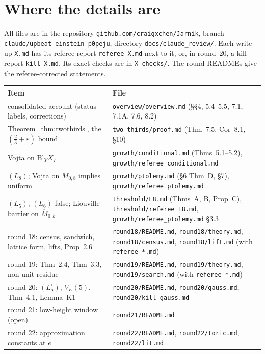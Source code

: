 \documentclass[11pt]{article}
\newcommand{\Mbar}{\overline M_{0,8}}
\newcommand{\rec}[1]{\texttt{#1}}
\begin{document}
\section{Where the details are}\label{sec:pointers}

All files are in the repository \rec{github.com/craigxchen/Jarnik}, branch
\rec{claude/upbeat-einstein-p0peju}, directory \rec{docs/claude\_review/}.
Each write-up \rec{X.md} has its referee report \rec{referee\_X.md} next to it,
or, in round~20, a kill report \rec{kill\_X.md}.  Its exact checks are in
\rec{X\_checks/}.  The round READMEs give the referee-corrected statements.

\begin{center}
\small
\begin{tabular}{@{}p{}p{}@{}}
\hline
\textbf{Item} & \textbf{File} \\
\hline
consolidated account (status labels, corrections) &
  \rec{overview/overview.md} (\S\S4, 5.4--5.5, 7.1, 7.1A, 7.6, 8.2) \\
Theorem~\ref{thm:twothirds}, the \((\frac23+\varepsilon)\) bound &
  \rec{two\_thirds/proof.md} (Thm~7.5, Cor~8.1, \S10) \\
Vojta on \(\mathrm{Bl}_YX_7\) &
  \rec{growth/conditional.md} (Thms~5.1--5.2),
  \rec{growth/referee\_conditional.md} \\
\((L_8)\); Vojta on \(\Mbar\) implies uniform &
  \rec{growth/ptolemy.md} (\S6 Thm~D, \S7), \rec{growth/referee\_ptolemy.md} \\
\((L_5)\), \((L_6)\) false; Liouville barrier on \(\overline M_{0,k}\) &
  \rec{threshold/L8.md} (Thms~A, B, Prop~C), \rec{threshold/referee\_L8.md},
  \rec{growth/referee\_ptolemy.md} \S3.3 \\
round 18: census, sandwich, lattice form, lifts, Prop~2.6 &
  \rec{round18/README.md}, \rec{round18/theory.md}, \rec{round18/census.md},
  \rec{round18/lift.md} (with \rec{referee\_*.md}) \\
round 19: Thm~2.4, Thm~3.3, non-unit residue &
  \rec{round19/README.md}, \rec{round19/theory.md}, \rec{round19/search.md}
  (with \rec{referee\_*.md}) \\
round 20: \((L_5^\circ)\), \(V_E(5)\), Thm~4.1, Lemma~K1 &
  \rec{round20/README.md}, \rec{round20/gauss.md}, \rec{round20/kill\_gauss.md} \\
round 21: low-height window (open) & \rec{round21/README.md} \\
round 22: approximation constants at \(e\) &
  \rec{round22/README.md}, \rec{round22/toric.md}, \rec{round22/lit.md} \\

\end{tabular}
\end{center}
\end{document}
